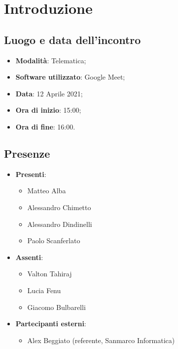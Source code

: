 \documentclass[]{article}
\begin{document}
	

	\newpage


	\section{Introduzione}
	\subsection{Luogo e data dell'incontro}
	\begin{itemize}
		\item \textbf{Modalità}: Telematica;
		\item \textbf{Software utilizzato}: Google Meet;
		\item \textbf{Data}: 12 Aprile 2021;
		\item \textbf{Ora di inizio}: 15:00;
		\item \textbf{Ora di fine}: 16:00.
	\end{itemize}

	\subsection{Presenze}
	\begin{itemize}
		\item \textbf{Presenti}:
		\begin{itemize}
			\item Matteo Alba
			\item Alessandro Chimetto
			\item Alessandro Dindinelli
			\item Paolo Scanferlato

		\end{itemize}
		\item \textbf{Assenti}:
		\begin{itemize}
			\item Valton Tahiraj
			\item Lucia Fenu
			\item Giacomo Bulbarelli

		\end{itemize}
		\item \textbf{Partecipanti esterni}:
		\begin{itemize}
			\item Alex Beggiato (referente, Sanmarco Informatica)
		\end{itemize}
	\end{itemize}
\end{document}
